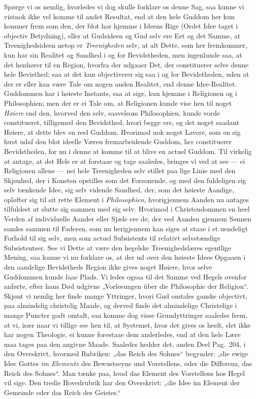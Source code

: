 \documentclass[12pt,a4paper]{book}
\newcommand{\apage}[1]{\marginnote{\footnotesize\textit{[#1]}}}
\begin{document}
Spørge vi os nemlig, hvorledes vi dog skulle forklare os denne Sag, saa kunne vi
vistnok ikke vel komme til andet Resultat, end at den hele Guddom her kun kommer
frem som den, der blot har hjemme i Ideens Rige (Ordet Idee taget i objectiv
Betydning), eller at Gudsideen og Gud selv ere Eet og det Samme, at
Treenighedsideen netop er \emph{Treenigheden} selv, at alt Dette, som her fremkommer, kun
har sin Realitet og Sandhed i og for Bevidstheden, men ingenlunde saa, at det
henhører til en Region, hvorfra der udgaaer Det, der constituerer selve \apage{150} denne hele
Bevisthed; saa at det kun objectiverer sig saa i og for Bevidstheden, uden at der
er eller kan være Tale om nogen anden Realitet, end denne Idee-Realitet. Guddommen
har i høieste Instants, saa at sige, kun hjemme i Religionen og i Philosophien;
men der er ei Tale om, at Religionen kunde vise hen til noget \emph{Høiere} end den,
hvorved den selv, saavelsom Philosophien, kunde vorde constitueret, tilligemed den
Bevidsthed, hvori begge ere, og det noget saadant Høiere, at dette blev en reel
Guddom. Hvorimod nok noget Lavere, som en sig først udaf den blot ideelle Væren
fremarbeidende Guddom, her constituerer Bevidstheden, for nu i denne at komme til
at blive en actuel Guddom. Til virkelig at antage, at det Hele er at forstaae og
tage saaledes, bringes vi ved at see --- ei Religionen allene --- nei hele
Treenigheden selv stillet paa lige Linie med den Skjønhed, der i Konsten opstilles
som det Forsonende, og med den fuldeligen sig selv tænkende Idee, sig selv vidende
Sandhed, der, som det høieste Aandige, opløfter sig til sit rette Element i
\emph{Philosophien}, hvorigjennem Aanden nu antages tilfuldest at slutte sig sammen med
sig selv. Hvorimod i Christendommen en heel Verden af individuelle Aander eller
Sjæle ere de, der ved Aanden gjennem Sønnen samles sammen til Faderen, som nu
herigjennem kan siges at staae i et uendeligt Forhold til sig selv, men som actuel
Subsistents til relativt selvstændige Subsistentser. See vi Dette at være den
hegelske Treenighedslæres egentlige Mening, saa kunne vi nu forklare os, at der ud
over den høieste Idees Opgaaen i den aandelige Bevidstheds Region ikke gives noget
Høiere, hvor selve Guddommen kunde faae Plads. Vi ledes ogsaa til det Samme ved
Hegels ovenfor anførte, efter hans Død udgivne „Vorlesungen über die Philosophie
der Religion“. Skjønt vi nemlig her finde mange Yttringer, hvori Gud omtales
ganske objectivt, paa almindelig christelig Maade, og derved finde det almindelige
Christelige i mange Puncter godt omtalt, \apage{151} saa komme dog visse Grundyttringer
saaledes frem, at vi, især naar vi tillige see hen til, at Systemet, hvor det gives
os heelt, slet ikke har nogen Theologie, ei kunne forestaae dem anderledes, end at
den hele Lære maa tages paa den angivne Maade. Saaledes hedder det, anden Deel
Pag.\ 204, i den Overskrivt, hvormed Rubriken: „das Reich des Sohnes“ begynder:
„die ewige Idee Gottes \emph{im Elemente} des Bewustseyns und Vorstellens, oder die
Differenz, das Reich des Sohnes“. Man tænke paa, hvad das Element des Vorstellens
hos Hegel vil sige. Den tredie Hovedrubrik har den Overskrivt: „die Idee im
Element der Gemeinde oder das Reich des Geistes.“
\end{document}
